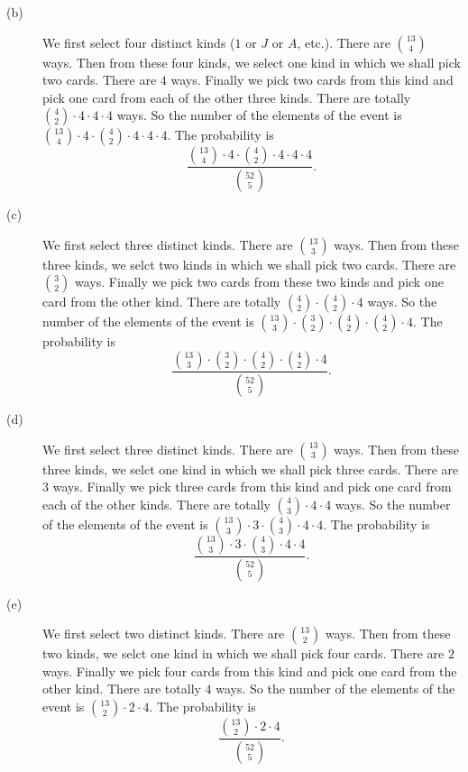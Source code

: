 \begin{description}
\begin{description}
\item[(b)] We first select four distinct kinds ($1$ or $J$
or $A$, etc.). There are 
${13\choose 4}$ ways. Then from these four kinds, we select one kind 
in which we shall pick two cards. There are $4$ ways. 
Finally we pick two cards from this kind and pick one card 
from each of the other three kinds. 
There are totally ${4\choose 2}\cdot 4\cdot 4\cdot 4$ ways. 
So the number of the elements of the event 
is ${13\choose 4} \cdot 4\cdot 
{4\choose 2}\cdot 4\cdot 4\cdot 4$. The probability is 
$$\frac{{13\choose 4} \cdot 4\cdot 
{4\choose 2}\cdot 4\cdot 4\cdot 4}{{52\choose 5}}.$$

\item[(c)] We first select three distinct kinds. There are 
${13\choose 3}$ ways. Then from these three kinds, we selct two 
kinds in which we shall pick two cards. There are ${3\choose 2}$ ways.
Finally we pick two cards from these two kinds and pick one card 
from the other kind. 
There are totally ${4\choose 2}\cdot {4\choose 2}\cdot 4$ ways. 
So the number of the elements of the event 
is ${13\choose 3} \cdot {3\choose 2}\cdot 
{4\choose 2}\cdot {4\choose 2}\cdot 4$. The probability is 
$$\frac{{13\choose 3} \cdot {3\choose 2}\cdot 
{4\choose 2}\cdot {4\choose 2}\cdot 4}{{52\choose 5}}.$$

\item[(d)] We first select three distinct kinds. There are 
${13\choose 3}$ ways. Then from these three kinds, we selct one
kind in which we shall pick three cards. There are $3$ ways.
Finally we pick three cards from this  kind and pick one card 
from each of the other kinds. 
There are totally ${4\choose 3}\cdot 4\cdot 4$ ways. 
So the number of the elements of the event 
is ${13\choose 3} \cdot 3\cdot 
{4\choose 3}\cdot 4\cdot 4$. The probability is 
$$\frac{{13\choose 3} \cdot 3\cdot 
{4\choose 3}\cdot 4\cdot 4}{{52\choose 5}}.$$

\item[(e)] We first select two distinct kinds. There are 
${13\choose 2}$ ways. Then from these two kinds, we selct one
kind in which we shall pick four cards. There are $2$ ways.
Finally we pick four cards from this  kind and pick one card 
from  the other kind. 
There are totally $4$ ways. 
So the number of the elements of the event 
is ${13\choose 2} \cdot 2\cdot  4$. The probability is 
$$\frac{{13\choose 2} \cdot 2\cdot  4}{{52\choose 5}}.$$


\end{description}


\end{description}
